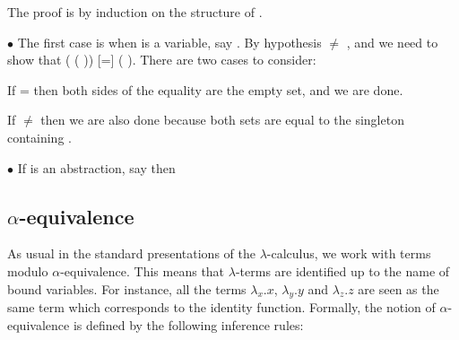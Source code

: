  The proof is by induction on the structure of .\newline 
\begin{coqdoccode}
\end{coqdoccode}
\noindent$\bullet$ The first case is when  is a variable, say . By hypothesis  \ensuremath{\not=} , and we need to show that   ( (   )) [=]   ( ). There are two cases to consider: 
\begin{coqdoccode}
\end{coqdoccode}
If  =  then both sides of the equality are the empty set, and we are done. 
\begin{coqdoccode}
\end{coqdoccode}
If  \ensuremath{\not=}  then we are also done because both sets are equal to the singleton containing .\newline 
\begin{coqdoccode}
\end{coqdoccode}
\noindent $\bullet$ If  is an abstraction, say    then 
\begin{coqdoccode}
\coqdocemptyline
\end{coqdoccode}
\subsection{$\alpha$-equivalence}



 As usual in the standard presentations of the $\lambda$-calculus, we work with terms modulo $\alpha$-equivalence. This means that $\lambda$-terms are identified up to the name of bound variables. For instance, all the terms $\lambda_x.x$, $\lambda_y.y$ and $\lambda_z.z$ are seen as the same term which corresponds to the identity function. Formally, the notion of $\alpha$-equivalence is defined by the following inference rules:




